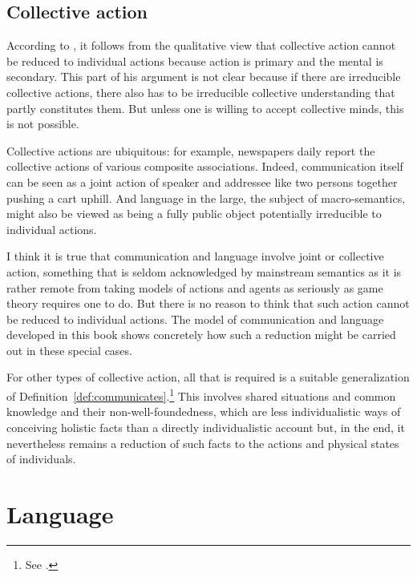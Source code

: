 \subsection{Collective action}

According to \citet{taylor:hpm}, it follows from the qualitative view that collective action cannot be reduced to individual actions because action is primary and the mental is secondary. This part of his argument is not clear because if there are irreducible collective actions, there also has to be irreducible collective understanding that partly constitutes them. But unless one is willing to accept collective minds, this is not possible.


Collective actions are ubiquitous: for example, newspapers daily report the collective actions of various composite associations. Indeed, communication itself can be seen as  a joint action of speaker and addressee like two persons together pushing a cart uphill. And language in the large, the subject of macro-semantics, might also be viewed as being a fully public object potentially irreducible to individual actions.

I think it is true that communication and language involve joint or collective action, something that is seldom acknowledged by mainstream semantics as it is rather remote from taking models of actions and agents as seriously as game theory requires one to do. But there is no reason to think that such action cannot be reduced to individual actions. The model of communication and language developed in this book shows concretely how such a reduction might be carried out in these special cases.

For other types of collective action, all that is required is a suitable generalization of Definition~\ref{def:communicates}.\footnote{See \citet[58--59]{parikh:ul}.} This involves shared situations and common knowledge and their non-well-foundedness, which are less individualistic ways of conceiving holistic facts than a directly individualistic account but, in the end, it nevertheless remains a reduction of such facts to the actions and physical states of individuals.


\section{Language} \label{sec:language}

